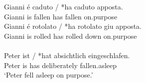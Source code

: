 \documentclass[output=paper]{langsci/langscibook}
\begin{document}
\ea\label{ex:10.25}  \parencite{FolliHarley2006}
    \ea
	\gll    Gianni é  caduto  /  *ha  caduto  apposta.\\
            Gianni is fallen {} \hphantom{*}has  fallen    on.purpose\\
    \ex
	\gll    Gianni é rotolato  /  *ha  rotolato  giu  apposta.\\
            Gianni is rolled {} \hphantom{*}has  rolled    down  on.purpose\\
    \z
\ex\label{ex:10.26} \\
    \gll    Peter ist / *hat  absichtlich  eingeschlafen.\\
            Peter is {} \hphantom{*}has  deliberately fallen.asleep\\
    \glt    ‘Peter fell asleep on purpose.’
\z
\end{document}
